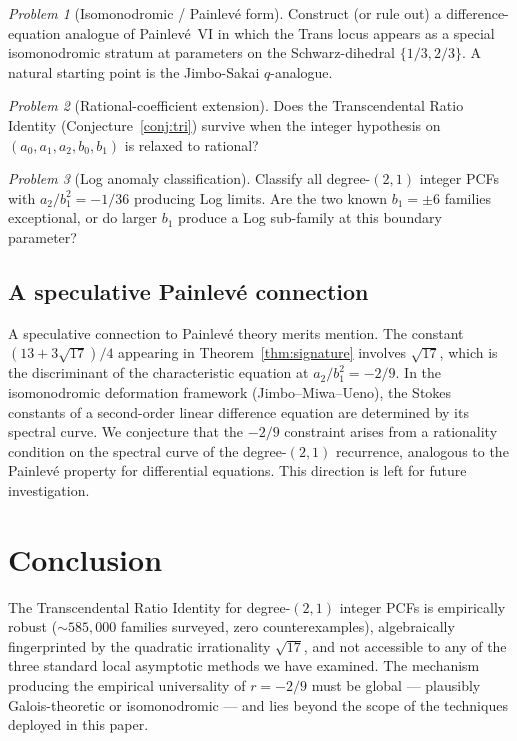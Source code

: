 \documentclass[11pt]{amsart}
\theoremstyle{definition}
\theoremstyle{remark}
\newtheorem{problem}{Problem}
\begin{document}
\begin{problem}[Isomonodromic / Painlevé form]\label{prob:painleve}
Construct (or rule out) a difference-equation analogue of
Painlevé~VI in which the Trans locus appears as a special
isomonodromic stratum at parameters on the Schwarz-dihedral
$\{1/3,2/3\}$.  A natural starting point is the Jimbo-Sakai
$q$-analogue.
\end{problem}

\begin{problem}[Rational-coefficient extension]
\label{prob:rational}
Does the Transcendental Ratio Identity (Conjecture~\ref{conj:tri})
survive when the integer hypothesis on $(a_0,a_1,a_2,b_0,b_1)$ is
relaxed to rational?
\end{problem}

\begin{problem}[Log anomaly classification]\label{prob:log-anomaly}
Classify all degree-$(2,1)$ integer PCFs with $a_2/b_1^2 = -1/36$
producing Log limits.  Are the two known $b_1=\pm 6$ families
exceptional, or do larger $b_1$ produce a Log sub-family at this
boundary parameter?
\end{problem}

\subsection{A speculative Painlev\'e connection}

A speculative connection to Painlev\'e theory merits mention.  The
constant $(13+3\sqrt{17})/4$ appearing in
Theorem~\ref{thm:signature} involves $\sqrt{17}$, which is the
discriminant of the characteristic equation at $a_2/b_1^2 = -2/9$.
In the isomonodromic deformation framework (Jimbo--Miwa--Ueno), the
Stokes constants of a second-order linear difference equation are
determined by its spectral curve.  We conjecture that the $-2/9$
constraint arises from a rationality condition on the spectral
curve of the degree-$(2,1)$ recurrence, analogous to the Painlev\'e
property for differential equations.  This direction is left for
future investigation.

\section{Conclusion}\label{sec:conclusion}

The Transcendental Ratio Identity for degree-$(2,1)$ integer PCFs is
empirically robust ($\sim\!585{,}000$ families surveyed, zero
counterexamples), algebraically fingerprinted by the quadratic
irrationality $\sqrt{17}$, and not accessible to any of the three
standard local asymptotic methods we have examined.  The mechanism
producing the empirical universality of $r=-2/9$ must be global ---
plausibly Galois-theoretic or isomonodromic --- and lies beyond the
scope of the techniques deployed in this paper.
\end{document}
